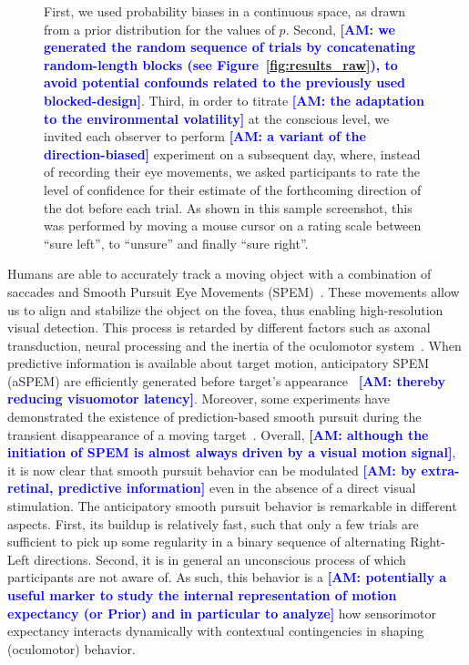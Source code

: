 \documentclass[12pt,english]{article}%
\newcommand{\citep}[1]{\parencite{#1}}
\newcommand{\seeFig}[1]{Figure~\ref{fig:#1}}
\newcommand{\AM}[1]{\textbf{\textcolor{blue}{[AM: #1]}}}
\begin{document}
\begin{figure}
{{First, we used probability biases in a continuous space,
as drawn from a prior distribution for the values of $p$.
Second, \AM{we generated the random sequence of trials
by concatenating random-length blocks (see \seeFig{results_raw}),
to avoid potential confounds related to the previously used blocked-design}.
Third, in order to titrate \AM{the adaptation to the environmental volatility} at the conscious level,
we invited each observer to perform \AM{a variant of the direction-biased} experiment on a subsequent day,
where, instead of recording their eye movements, we asked participants to rate the level of confidence
for their estimate of the forthcoming direction of the dot before each trial.
As shown in this sample screenshot, 
this was performed by moving a mouse cursor on a rating scale
between ``sure left'', to ``unsure'' and finally ``sure right''.
}
\label{fig:intro}
}
\end{figure}

Humans are able to accurately track a moving object
with a combination of saccades and
Smooth Pursuit Eye Movements (SPEM)~\citep{ref}.
These movements allow us to align and
stabilize the object on the fovea,
thus enabling high-resolution visual detection.
This process is retarded by different factors such as axonal transduction,
neural processing and the inertia of the oculomotor system~\citep{Krauzlis89}.
When predictive information is available about target motion,
anticipatory SPEM (aSPEM) are
efficiently generated before target's appearance~\citep{Westheimer1954, Kowler1979a, Kowler1979b} \AM{thereby reducing visuomotor latency}.
Moreover, some experiments have demonstrated the existence
of prediction-based smooth pursuit during
the transient disappearance of a moving target~\citep{Badler2006,BeckerFuchs1985}.
Overall, \AM{although the initiation of SPEM is almost always driven by a visual motion signal}, it is now clear that smooth pursuit behavior
can be modulated \AM{by extra-retinal, predictive information} even in the absence of a direct visual stimulation.
The anticipatory smooth pursuit behavior is remarkable
in different aspects.
First, its buildup is relatively fast, such that only a few trials are sufficient
to pick up some regularity in a binary sequence of alternating Right-Left directions.
Second, it is in general an unconscious process
of which participants are not aware of.
As such, this behavior is a \AM{potentially a useful marker
to study the internal representation of motion expectancy (or Prior) and in particular to analyze} how sensorimotor expectancy interacts dynamically with contextual contingencies in shaping (oculomotor) behavior.
\end{document}
